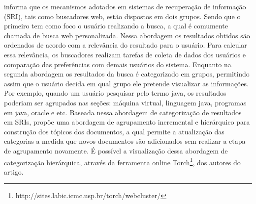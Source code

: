 \cite{Matsumoto10} informa que os mecanismos adotados em sistemas de recuperação de informação 
(SRI), tais como buscadores web, estão dispostos em dois grupos. Sendo que o primeiro tem como
foco o usuário realizando a busca, a qual é comumente chamada de busca web personalizada. 
Nessa abordagem os resultados obtidos são ordenados de acordo com a relevância do resultado
para o usuário. Para calcular essa relevância, os buscadores realizam tarefas de 
coleta de dados dos usuários e comparação das preferências com demais usuários do sistema.  
Enquanto na segunda abordagem os resultados da busca é categorizado em grupos, permitindo assim
que o usuário decida em qual grupo ele pretende visualizar as informações. Por exemplo, quando um usuário pesquisar pelo termo java, os resultados poderiam ser agrupados nas seções: máquina virtual,
linguagem java, programas em java, oracle e etc. Baseada nessa abordagem de categorização 
de resultados em SRIs, \cite{MarcaciniR10} propõe uma abordagem de agrupamento incremental 
e hierárquico para construção dos tópicos dos documentos, a qual permite a atualização das 
categorias a medida que novos documentos são adicionados sem realizar a etapa de agrupamento 
novamente. É possível a visualização dessa abordagem de categorização hierárquica, 
através da ferramenta online 
Torch\footnote{http://sites.labic.icmc.usp.br/torch/webcluster/},
dos autores do artigo.

